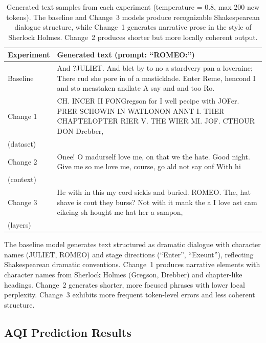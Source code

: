 \documentclass[conference]{IEEEtran}
\begin{document}
\begin{table}[t]
\centering
\caption{Generated text samples from each experiment (temperature = 0.8, max 200 new tokens). The baseline and Change~3 models produce recognizable Shakespearean dialogue structure, while Change~1 generates narrative prose in the style of Sherlock Holmes. Change~2 produces shorter but more locally coherent output.}
\label{tab:samples}
\begin{tabular}{p{}>{\raggedright\arraybackslash}p{}}
\toprule
\textbf{Experiment} & \textbf{Generated text (prompt: ``ROMEO:'')} \\
\midrule
Baseline & {\ttfamily And ?JULIET. And blet by to no a stardvery pan a loveraine; There rud she pore in of a masticklade. Enter Reme, hencond I and sto meastaken andlate A say and and too Ro.} \\
\midrule
Change 1 & {\ttfamily CH. INCER II FONGregson for I well pecipe with JOFer. PRER SCHOWIN IN WATLONON ANNT I. THER CHAPTELOPTER RIER V. THE WIER MI. JOF. CTHOUR DON Drebber,} \\
(dataset) & \\
\midrule
Change 2 & {\ttfamily Onee! O madurself love me, on that we the hate. Good night. Give me so me love me, course, go ald not say onf With hi} \\
(context) & \\
\midrule
Change 3 & {\ttfamily He with in this my cord sickis and buried. ROMEO. The, hat shave is cout they burss? Not with it mank the a I love ast cam cikeing sh hought me hat her a sampon,} \\
(layers) & \\
\bottomrule
\end{tabular}
\end{table}

The baseline model generates text structured as dramatic dialogue with character names (JULIET, ROMEO) and stage directions (``Enter'', ``Exeunt''), reflecting Shakespearean dramatic conventions. Change~1 produces narrative elements with character names from Sherlock Holmes (Gregson, Drebber) and chapter-like headings. Change~2 generates shorter, more focused phrases with lower local perplexity. Change~3 exhibits more frequent token-level errors and less coherent structure.

\subsection{AQI Prediction Results}
\end{document}
